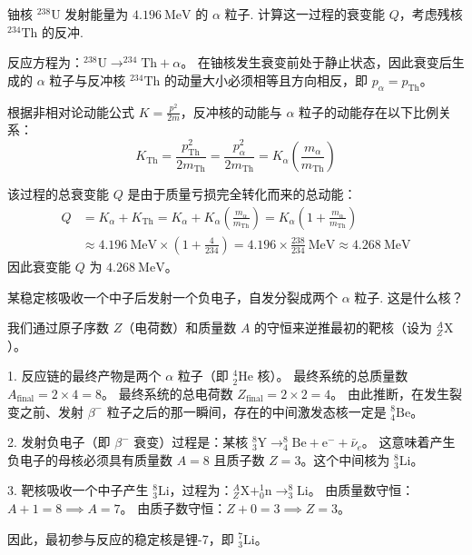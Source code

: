 \begin{exercise}\label{ex:29.19}
铀核 $^{238}\mathrm{U}$ 发射能量为 $4.196 \ \mathrm{MeV}$ 的 $\alpha$ 粒子. 计算这一过程的衰变能 $Q$，考虑残核 $^{234}\mathrm{Th}$ 的反冲.
\end{exercise}
\begin{solution}
反应方程为：$^{238}\mathrm{U} \rightarrow ^{234}\mathrm{Th} + \alpha$。
在铀核发生衰变前处于静止状态，因此衰变后生成的 $\alpha$ 粒子与反冲核 $^{234}\mathrm{Th}$ 的动量大小必须相等且方向相反，即 $p_\alpha = p_{\mathrm{Th}}$。

根据非相对论动能公式 $K = \frac{p^2}{2m}$，反冲核的动能与 $\alpha$ 粒子的动能存在以下比例关系：
$$ K_{\mathrm{Th}} = \frac{p_{\mathrm{Th}}^2}{2m_{\mathrm{Th}}} = \frac{p_\alpha^2}{2m_{\mathrm{Th}}} = K_\alpha \left( \frac{m_\alpha}{m_{\mathrm{Th}}} \right) $$

该过程的总衰变能 $Q$ 是由于质量亏损完全转化而来的总动能：
\begin{align*}
    Q &= K_\alpha + K_{\mathrm{Th}} = K_\alpha + K_\alpha \left( \frac{m_\alpha}{m_{\mathrm{Th}}} \right) = K_\alpha \left( 1 + \frac{m_\alpha}{m_{\mathrm{Th}}} \right) \\
      &\approx 4.196 \ \mathrm{MeV} \times \left( 1 + \frac{4}{234} \right) = 4.196 \times \frac{238}{234} \ \mathrm{MeV} \approx 4.268 \ \mathrm{MeV}
\end{align*}
因此衰变能 $Q$ 为 $4.268 \ \mathrm{MeV}$。
\end{solution}

\begin{exercise}\label{ex:29.20}
某稳定核吸收一个中子后发射一个负电子，自发分裂成两个 $\alpha$ 粒子. 这是什么核？
\end{exercise}
\begin{solution}
我们通过原子序数 $Z$（电荷数）和质量数 $A$ 的守恒来逆推最初的靶核（设为 $^{A}_{Z}\mathrm{X}$）。

1. 反应链的最终产物是两个 $\alpha$ 粒子（即 $^4_2\mathrm{He}$ 核）。
最终系统的总质量数 $A_{\mathrm{final}} = 2 \times 4 = 8$。
最终系统的总电荷数 $Z_{\mathrm{final}} = 2 \times 2 = 4$。
由此推断，在发生裂变之前、发射 $\beta^-$ 粒子之后的那一瞬间，存在的中间激发态核一定是 $^8_4\mathrm{Be}$。

2. 发射负电子（即 $\beta^-$ 衰变）过程是：某核 $^8_{3}\mathrm{Y} \rightarrow ^8_4\mathrm{Be} + \mathrm{e}^- + \bar{\nu}_e$。
这意味着产生负电子的母核必须具有质量数 $A=8$ 且质子数 $Z=3$。这个中间核为 $^8_3\mathrm{Li}$。

3. 靶核吸收一个中子产生 $^8_3\mathrm{Li}$，过程为：$^{A}_{Z}\mathrm{X} + ^1_0\mathrm{n} \rightarrow ^8_3\mathrm{Li}$。
由质量数守恒：$A + 1 = 8 \implies A = 7$。
由质子数守恒：$Z + 0 = 3 \implies Z = 3$。

因此，最初参与反应的稳定核是锂-7，即 $^7_3\mathrm{Li}$。
\end{solution}

